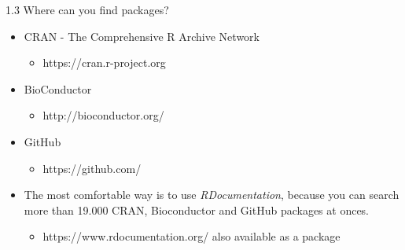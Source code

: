 \documentclass[11pt,a4paper]{beamer}
\begin{document}
\begin{frame}[t]{1.3 Where can you find packages?}
	
		
	\begin{itemize}
		\item CRAN -  The Comprehensive R Archive Network 
		
			\begin{itemize}
				\item[] https://cran.r-project.org 
			\end{itemize}
		
		\item BioConductor
		
			\begin{itemize}
				\item[] http://bioconductor.org/
			\end{itemize}
	
		\item GitHub
	
			\begin{itemize}
				\item[] https://github.com/
			\end{itemize}
		
		\item The most comfortable way is to use \textit{RDocumentation}, because you can search more than 19.000 CRAN, Bioconductor and GitHub packages at onces.
	
			\begin{itemize}
				\item[] https://www.rdocumentation.org/ also available as a package
			\end{itemize}
			
	\end{itemize}
	
\end{frame}




\end{document}
